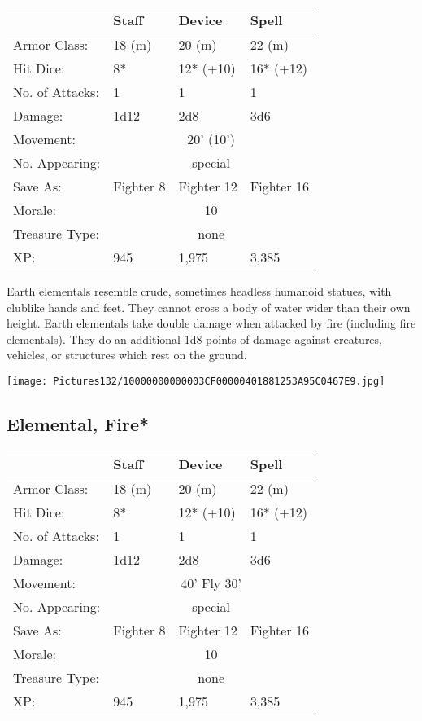 \documentclass[a4paper,twoside,openany,10pt]{book}
\begin{document}
\begin{multicols}{2}
\begin{tabularx}{0.48\textwidth}{@{}lXXX@{}}
& Staff & Device & Spell \\\hline
Armor Class: & 18 (m) & 20 (m) & 22 (m) \\\hline
Hit Dice: & 8* & 12* (+10) & 16* (+12) \\\hline
No. of Attacks: & 1 & 1 & 1 \\\hline
Damage: & 1d12 & 2d8 & 3d6 \\\hline
Movement: & \multicolumn{3}{c}{20' (10')} \\\hline
No. Appearing: &\multicolumn{3}{c}{special} \\\hline
Save As: & Fighter 8 & Fighter 12 & Fighter 16 \\\hline
Morale: & \multicolumn{3}{c}{10} \\\hline
Treasure Type: & \multicolumn{3}{c}{none} \\\hline
XP: & 945 & 1,975 & 3,385 \\\hline
\end{tabularx}\medskip

Earth elementals resemble crude, sometimes headless humanoid statues, with clublike hands and feet. They cannot cross a body of water wider than their own height. Earth elementals take double damage when attacked by fire (including fire elementals). They do an additional 1d8 points of damage against creatures, vehicles, or structures which rest on the ground.

\begin{center}
	\texttt{[image: Pictures132/10000000000003CF00000401881253A95C0467E9.jpg]}
\end{center}

\columnbreak


\subsection*{Elemental, Fire*}\label{elemental-fire}
\begin{tabularx}{0.48\textwidth}{@{}lllX@{}}
& Staff & Device & Spell \\\hline
Armor Class: & 18 (m) & 20 (m) & 22 (m) \\\hline
Hit Dice: & 8* & 12* (+10) & 16* (+12) \\\hline
No. of Attacks: & 1 & 1 & 1 \\\hline
Damage: & 1d12 & 2d8 & 3d6 \\\hline
Movement:  & \multicolumn{3}{c}{40' Fly 30'}\\\hline
No. Appearing: &\multicolumn{3}{c}{special} \\\hline
Save As: & Fighter 8 & Fighter 12 & Fighter 16 \\\hline
Morale: & \multicolumn{3}{c}{10} \\\hline
Treasure Type: & \multicolumn{3}{c}{none} \\\hline
XP: & 945 & 1,975 & 3,385 \\\hline
\end{tabularx}\medskip


\end{multicols}
\end{document}
